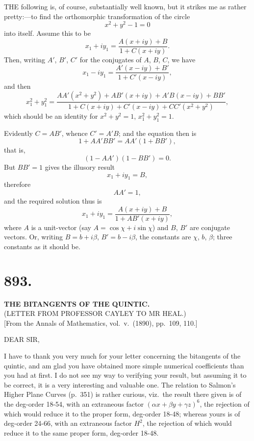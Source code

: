 \documentclass[11pt,a4paper]{article}
\begin{document}
THE following is, of course, substantially well known, but it strikes me as rather pretty:---to find the orthomorphic transformation of the circle
\[
x^2 + y^2 - 1 = 0
\]
into itself. Assume this to be
\[
x_1 + iy_1 = \frac{A(x+iy) + B}{1 + C(x+iy)}.
\]
Then, writing $A'$, $B'$, $C'$ for the conjugates of $A$, $B$, $C$, we have
\[
x_1 - iy_1 = \frac{A'(x-iy) + B'}{1 + C'(x-iy)},
\]
and then
\[
x_1^2 + y_1^2 = \frac{AA'(x^2+y^2) + AB'(x+iy) + A'B(x-iy) + BB'}{1 + C(x+iy) + C'(x-iy) + CC'(x^2+y^2)},
\]
which should be an identity for $x^2 + y^2 = 1$, $x_1^2 + y_1^2 = 1$.

Evidently $C = AB'$, whence $C' = A'B$; and the equation then is
\[
1 + AA'BB' = AA'(1 + BB'),
\]
that is,
\[
(1 - AA')(1 - BB') = 0.
\]
But $BB' = 1$ gives the illusory result
\[
x_1 + iy_1 = B,
\]
therefore
\[
AA' = 1,
\]
and the required solution thus is
\[
x_1 + iy_1 = \frac{A(x+iy) + B}{1 + AB'(x+iy)},
\]
where $A$ is a unit-vector (say $A = \cos\chi + i\sin\chi$) and $B$, $B'$ are conjugate vectors. Or, writing $B = b + i\beta$, $B' = b - i\beta$, the constants are $\chi$, $b$, $\beta$; three constants as it should be.


\section*{893.}
\begin{center}
{\large\bfseries THE BITANGENTS OF THE QUINTIC.}\\[0.3em]
{\small (LETTER FROM PROFESSOR CAYLEY TO MR HEAL.)}\\[0.3em]
\small [From the Annals of Mathematics, vol.\ v.\ (1890), pp.\ 109, 110.]
\end{center}

DEAR SIR,

I have to thank you very much for your letter concerning the bitangents of the quintic, and am glad you have obtained more simple numerical coefficients than you had at first. I do not see my way to verifying your result, but assuming it to be correct, it is a very interesting and valuable one. The relation to Salmon's Higher Plane Curves (p.\ 351) is rather curious, viz.\ the result there given is of the deg-order 18-54, with an extraneous factor $(\alpha x + \beta y + \gamma z)^6$, the rejection of which would reduce it to the proper form, deg-order 18-48; whereas yours is of deg-order 24-66, with an extraneous factor $H^2$, the rejection of which would reduce it to the same proper form, deg-order 18-48.
\end{document}
